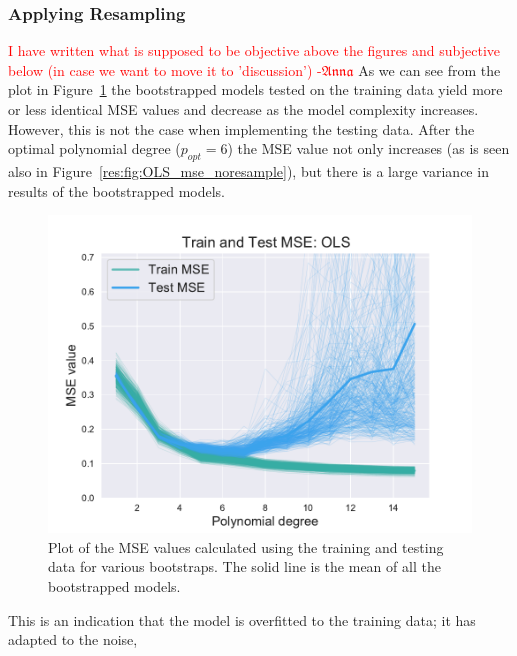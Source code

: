 \documentclass[twocolumn,english,notitlepage]{article}
\newcommand{\comment}[1]{\textcolor{red}{#1}}
\newcommand{\Anna}{$\mathfrak{Anna}$}
\begin{document}
        \subsubsection{Applying Resampling}
        \comment{I  have written what is supposed to be objective above the figures and subjective below (in case we want to move it to 'discussion') -\Anna}
            As we can see from the plot in Figure~\ref{res:fig:bs_train_test_ols} the bootstrapped models tested on the training data yield more or less identical MSE values and decrease as the model complexity increases. However, this is not the case when implementing the testing data. After the optimal polynomial degree ($ p_{opt} = 6$) the MSE value not only increases (as is seen also in Figure~\ref{res:fig:OLS_mse_noresample}), but there is a large variance in results of the bootstrapped models.  
            \begin{figure}[ht]
                \centering
                \includegraphics[width=\linewidth]{BS_train_test_mse_OLS.pdf}
                \caption{Plot of the MSE values calculated using the training and testing data for various bootstraps. The solid line is the mean of all the bootstrapped models.}
                \label{res:fig:bs_train_test_ols}
            \end{figure}
            This is an indication that the model is overfitted to the training data; it has adapted to the noise, 
  
\end{document}

